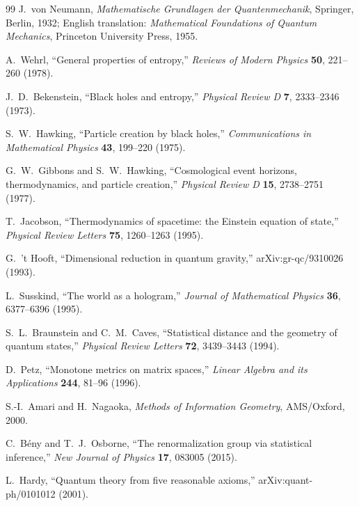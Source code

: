 \documentclass[11pt]{article}
\begin{document}
\begin{thebibliography}{99}
J.\ von Neumann, \emph{Mathematische Grundlagen der Quantenmechanik}, Springer, Berlin, 1932;
English translation: \emph{Mathematical Foundations of Quantum Mechanics}, Princeton University Press, 1955.

A.\ Wehrl, ``General properties of entropy,''
\emph{Reviews of Modern Physics} \textbf{50}, 221--260 (1978).

J.\ D.\ Bekenstein, ``Black holes and entropy,''
\emph{Physical Review D} \textbf{7}, 2333--2346 (1973).

S.\ W.\ Hawking, ``Particle creation by black holes,''
\emph{Communications in Mathematical Physics} \textbf{43}, 199--220 (1975).

G.\ W.\ Gibbons and S.\ W.\ Hawking, ``Cosmological event horizons, thermodynamics, and particle creation,''
\emph{Physical Review D} \textbf{15}, 2738--2751 (1977).

T.\ Jacobson, ``Thermodynamics of spacetime: the Einstein equation of state,''
\emph{Physical Review Letters} \textbf{75}, 1260--1263 (1995).

G.\ 't Hooft, ``Dimensional reduction in quantum gravity,''
arXiv:gr-qc/9310026 (1993).

L.\ Susskind, ``The world as a hologram,''
\emph{Journal of Mathematical Physics} \textbf{36}, 6377--6396 (1995).

S.\ L.\ Braunstein and C.\ M.\ Caves, ``Statistical distance and the geometry of quantum states,''
\emph{Physical Review Letters} \textbf{72}, 3439--3443 (1994).

D.\ Petz, ``Monotone metrics on matrix spaces,''
\emph{Linear Algebra and its Applications} \textbf{244}, 81--96 (1996).

S.-I.\ Amari and H.\ Nagaoka, \emph{Methods of Information Geometry}, AMS/Oxford, 2000.

C.\ B\'eny and T.\ J.\ Osborne, ``The renormalization group via statistical inference,''
\emph{New Journal of Physics} \textbf{17}, 083005 (2015).

L.\ Hardy, ``Quantum theory from five reasonable axioms,''
arXiv:quant-ph/0101012 (2001).


\end{thebibliography}
\end{document}
